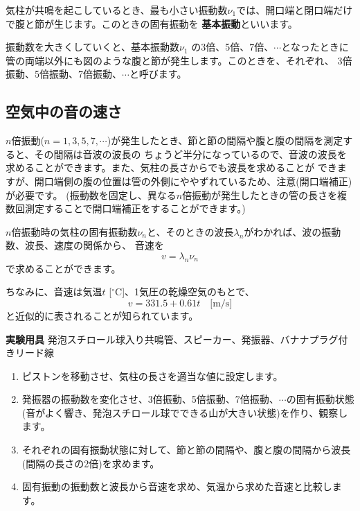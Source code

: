 気柱が共鳴を起こしているとき、最も小さい振動数$\nu_1$では、開口端と閉口端だけで腹と節が生じます。このときの固有振動を
{\bf 基本振動}といいます。

振動数を大きくしていくと、基本振動数$\nu_1$ の3倍、5倍、7倍、$\cdots$となったときに
管の両端以外にも図のような腹と節が発生します。このときを、それぞれ、
3倍振動、5倍振動、7倍振動、$\cdots$と呼びます。

\subsection{空気中の音の速さ}

$n$倍振動($n=1,3,5,7,\cdots$)が発生したとき、節と節の間隔や腹と腹の間隔を測定すると、その間隔は音波の波長の
ちょうど半分になっているので、音波の波長を求めることができます。また、気柱の長さからでも波長を求めることが
できますが、開口端側の腹の位置は管の外側にややずれているため、注意(開口端補正)が必要です。
(振動数を固定し、異なる$n$倍振動が発生したときの管の長さを複数回測定することで開口端補正をすることができます。)

$n$倍振動時の気柱の固有振動数$\nu_n$と、そのときの波長$\lambda_n$がわかれば、波の振動数、波長、速度の関係から、
音速を
\[
v = \lambda_n \nu_n
\]
で求めることができます。

ちなみに、音速は気温$t$ [${}^\circ$C]、1気圧の乾燥空気のもとで、
\[
v = 331.5 + 0.61 t \quad \text{[m/s]}
\]
と近似的に表されることが知られています。


\newpage

\jikken

\begin{itemsquarebox}[c]{\bf 実験用具}
発泡スチロール球入り共鳴管、スピーカー、発振器、バナナプラグ付きリード線
\end{itemsquarebox}

\bigskip


\begin{enumerate}

\item ピストンを移動させ、気柱の長さを適当な値に設定します。

\item 発振器の振動数を変化させ、3倍振動、5倍振動、7倍振動、$\cdots$の固有振動状態
(音がよく響き、発泡スチロール球でできる山が大きい状態)を作り、観察します。

\item それぞれの固有振動状態に対して、節と節の間隔や、腹と腹の間隔から波長(間隔の長さの2倍)を求めます。

\item 固有振動の振動数と波長から音速を求め、気温から求めた音速と比較します。

\end{enumerate}


